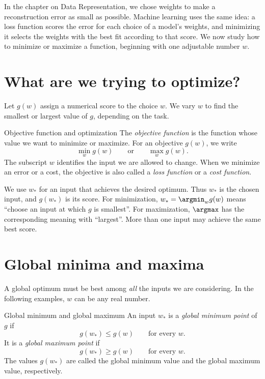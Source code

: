 \documentclass[a4paper,12pt,oneside]{report}
\begin{document}
\smallskip
In the chapter on Data Representation, we chose weights to make a
reconstruction error as small as possible. Machine learning uses the
same idea: a loss function scores the error for each choice of a
model's weights, and minimizing it selects the weights with the best
fit according to that score. We now study how to minimize or maximize
a function, beginning with one adjustable number $w$.

\section{What are we trying to optimize?}

Let $g(w)$ assign a numerical score to the choice $w$. We vary $w$
to find the smallest or largest value of $g$, depending on the task.

\begin{frameddefn}{Objective function and optimization}\label{def:optimization-objective}
The \emph{objective function} is the function whose value we want to
minimize or maximize. For an objective $g(w)$, we write
\[
  \min_w g(w)\qquad\text{or}\qquad\max_w g(w).
\]
The subscript $w$ identifies the input we are allowed to change.
When we minimize an error or a cost, the objective is also called a
\emph{loss function} or a \emph{cost function}.
\end{frameddefn}

We use $w_*$ for an input that achieves the desired optimum. Thus
$w_*$ is the chosen input, and $g(w_*)$ is its score. For minimization,
$w_*=\argmin_w g(w)$ means ``choose an input at which $g$ is
smallest''. For maximization, $\argmax$ has the corresponding meaning
with ``largest''. More than one input may achieve the same best score.

\section{Global minima and maxima}

A global optimum must be best among \emph{all} the inputs we are
considering. In the following examples, $w$ can be any real number.

\begin{frameddefn}{Global minimum and global maximum}\label{def:global-optimum}
An input $w_*$ is a \emph{global minimum point} of $g$ if
\[
  g(w_*)\leq g(w)\qquad\text{for every }w.
\]
It is a \emph{global maximum point} if
\[
  g(w_*)\geq g(w)\qquad\text{for every }w.
\]
The values $g(w_*)$ are called the global minimum value and the
global maximum value, respectively.
\end{frameddefn}
\end{document}
